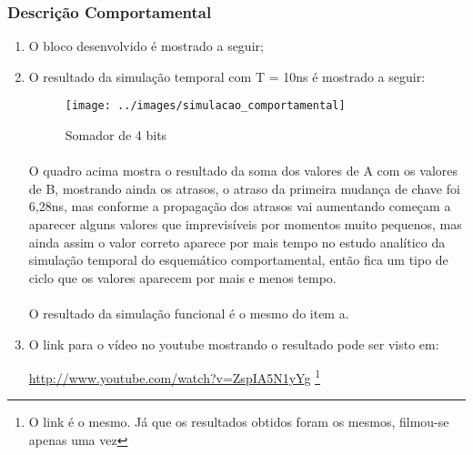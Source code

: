 \subsubsection{Descrição Comportamental}
\begin{enumerate}[label=(\alph*)]
\item
 O bloco desenvolvido é mostrado a seguir;

\begin{tiny}
    
\end{tiny}   

\item
O resultado da simulação temporal com T = 10ns é mostrado a seguir:

\begin{figure}[H]
    \centering
    \texttt{[image: ../images/simulacao\_comportamental]}
    \caption{Somador de 4 bits}
\end{figure}



\paragraph{}O quadro acima mostra o resultado da soma dos valores de A com os valores de B, mostrando ainda os atrasos, o atraso da primeira mudança de chave foi 6,28ns, mas conforme a propagação dos atrasos vai aumentando começam a aparecer alguns valores que imprevisíveis por momentos muito pequenos, mas ainda assim o valor correto aparece por mais tempo no estudo analítico da simulação temporal do esquemático comportamental, então fica um tipo de ciclo que os valores aparecem por mais e menos tempo.


\paragraph{}O resultado da simulação funcional é o mesmo do item a.
\item
O link para o vídeo no youtube mostrando o resultado pode ser visto em:

\url{http://www.youtube.com/watch?v=ZspIA5N1yYg}
\footnote{O link é o mesmo. Já que os resultados obtidos foram os mesmos, filmou-se apenas uma vez}
\end{enumerate}
